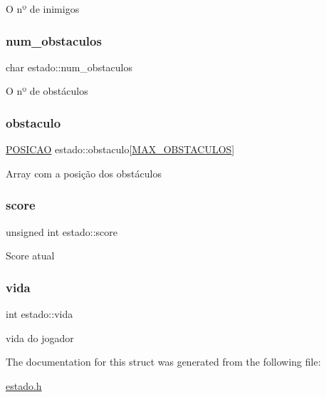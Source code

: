 O nº de inimigos \mbox{\label{structestado_ac1a8a541e2301189833c6f713c416063}} 
\subsubsection{\texorpdfstring{num\+\_\+obstaculos}{num\_obstaculos}}
{\footnotesize\ttfamily char estado\+::num\+\_\+obstaculos}

O nº de obstáculos \mbox{\label{structestado_a970dc20c6687acb17c3f08c06edbed4f}} 
\subsubsection{\texorpdfstring{obstaculo}{obstaculo}}
{\footnotesize\ttfamily \hyperlink{estado_8h_a55b3f4b56938eeb8fa5e8f9c07baf1b0}{P\+O\+S\+I\+C\+AO} estado\+::obstaculo\mbox{[}\hyperlink{estado_8h_ac574e2817856ecc9a890d2d47cb9d783}{M\+A\+X\+\_\+\+O\+B\+S\+T\+A\+C\+U\+L\+OS}\mbox{]}}

Array com a posição dos obstáculos \mbox{\label{structestado_a2a942cbf4c428e31bdcf60c13bedba48}} 
\subsubsection{\texorpdfstring{score}{score}}
{\footnotesize\ttfamily unsigned int estado\+::score}

Score atual \mbox{\label{structestado_aa07b03f94dec49b294dbc278b12b4d11}} 
\subsubsection{\texorpdfstring{vida}{vida}}
{\footnotesize\ttfamily int estado\+::vida}

vida do jogador 

The documentation for this struct was generated from the following file\+:\begin{DoxyCompactItemize}
\item 
\hyperlink{estado_8h}{estado.\+h}\end{DoxyCompactItemize}
